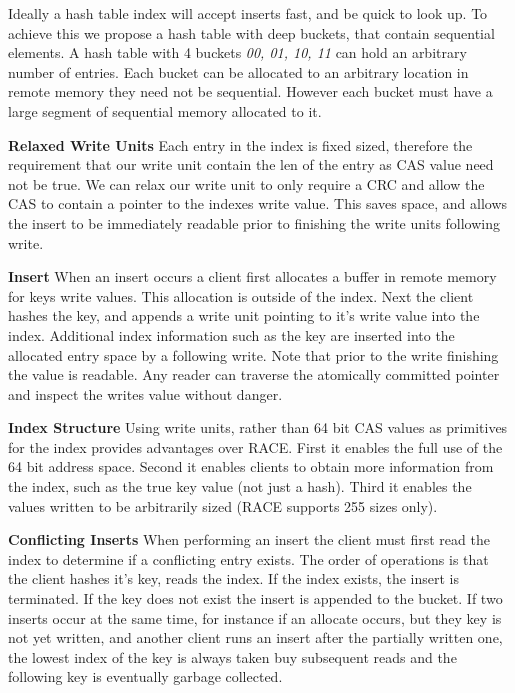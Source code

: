 Ideally a hash table index will accept inserts fast, and be quick to look up. To
achieve this we propose a hash table with deep buckets, that contain sequential
elements. A hash table with 4 buckets \textit{00, 01, 10, 11} can hold an
arbitrary number of entries. Each bucket can be allocated to an arbitrary
location in remote memory they need not be sequential. However each bucket must
have a large segment of sequential memory allocated to it.

\textbf{Relaxed Write Units} Each entry in the index is fixed sized, therefore
the requirement that our write unit contain the len of the entry as CAS value
need not be true. We can relax our write unit to only require a CRC and allow
the CAS to contain a pointer to the indexes write value. This saves space, and
allows the insert to be immediately readable prior to finishing the write units
following write.

\textbf{Insert} When an insert occurs a client first allocates a buffer in
remote memory for keys write values. This allocation is outside of the index.
Next the client hashes the key, and appends a write unit pointing to it's write
value into the index. Additional index information such as the key are inserted
into the allocated entry space by a following write. Note that prior to the
write finishing the value is readable. Any reader can traverse the atomically
committed pointer and inspect the writes value without danger.

\textbf{Index Structure} Using write units, rather than 64 bit CAS values as
primitives for the index provides advantages over RACE. First it enables the
full use of the 64 bit address space. Second it enables clients to obtain more
information from the index, such as the true key value (not just a hash). Third
it enables the values written to be arbitrarily sized (RACE supports 255 sizes
only).

\textbf{Conflicting Inserts} When performing an insert the client must first
read the index to determine if a conflicting entry exists. The order of
operations is that the client hashes it's key, reads the index. If the index
exists, the insert is terminated. If the key does not exist the insert is
appended to the bucket. If two inserts occur at the same time, for instance if
an allocate occurs, but they key is not yet written, and another client runs an
insert after the partially written one, the lowest index of the key is always
taken buy subsequent reads and the following key is eventually garbage collected.

